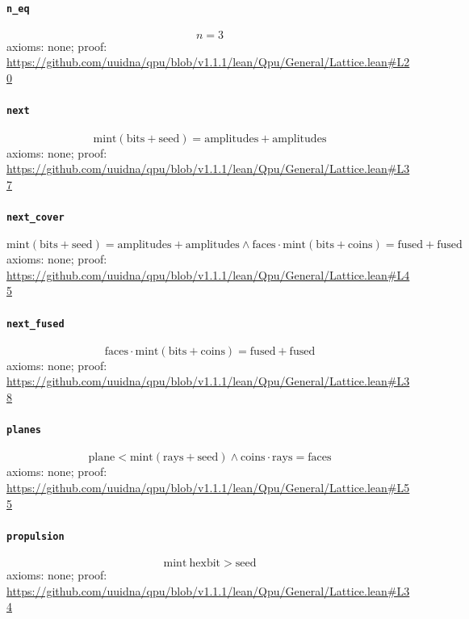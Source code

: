 \documentclass[11pt]{article}
\begin{document}
\paragraph{\texttt{n\_eq}}
\[ n = 3 \]
\noindent axioms: none; proof: \url{https://github.com/uuidna/qpu/blob/v1.1.1/lean/Qpu/General/Lattice.lean\#L20}

\paragraph{\texttt{next}}
\[ \mathrm{mint} (\mathrm{bits} + \mathrm{seed}) = \mathrm{amplitudes} + \mathrm{amplitudes} \]
\noindent axioms: none; proof: \url{https://github.com/uuidna/qpu/blob/v1.1.1/lean/Qpu/General/Lattice.lean\#L37}

\paragraph{\texttt{next\_cover}}
\[ \mathrm{mint} (\mathrm{bits} + \mathrm{seed}) = \mathrm{amplitudes} + \mathrm{amplitudes} \land \mathrm{faces} \cdot \mathrm{mint} (\mathrm{bits} + \mathrm{coins}) = \mathrm{fused} + \mathrm{fused} \]
\noindent axioms: none; proof: \url{https://github.com/uuidna/qpu/blob/v1.1.1/lean/Qpu/General/Lattice.lean\#L45}

\paragraph{\texttt{next\_fused}}
\[ \mathrm{faces} \cdot \mathrm{mint} (\mathrm{bits} + \mathrm{coins}) = \mathrm{fused} + \mathrm{fused} \]
\noindent axioms: none; proof: \url{https://github.com/uuidna/qpu/blob/v1.1.1/lean/Qpu/General/Lattice.lean\#L38}

\paragraph{\texttt{planes}}
\[ \mathrm{plane} < \mathrm{mint} (\mathrm{rays} + \mathrm{seed}) \land \mathrm{coins} \cdot \mathrm{rays} = \mathrm{faces} \]
\noindent axioms: none; proof: \url{https://github.com/uuidna/qpu/blob/v1.1.1/lean/Qpu/General/Lattice.lean\#L55}

\paragraph{\texttt{propulsion}}
\[ \mathrm{mint}\ \mathrm{hexbit} > \mathrm{seed} \]
\noindent axioms: none; proof: \url{https://github.com/uuidna/qpu/blob/v1.1.1/lean/Qpu/General/Lattice.lean\#L34}
\end{document}
